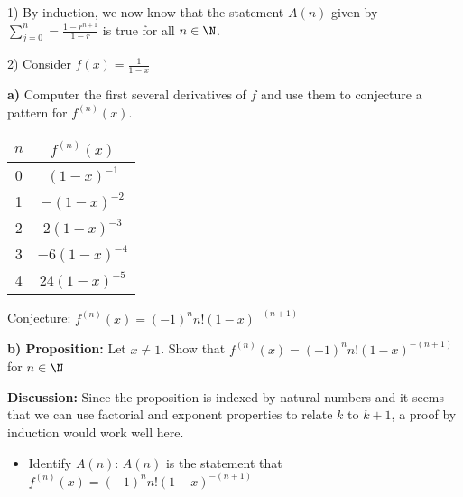 \begin{paragraph}{1)}
        By induction, we now know that the statement $A(n)$ given by $\sum_{j = 0}^{n} = \frac{1 - r^{n+1}}{1-r}$ is true for all $n \in \N$. \\
        \proofEnd
        
    \end{paragraph}

    \bigskip    

    \begin{paragraph}{2)}
        Consider $f(x) = \frac{1}{1-x}$
        \spacing

        \textbf{a)} Computer the first several derivatives of $f$ and use them to conjecture a pattern for $f^{(n)}(x)$.\\
        \separate
        \begin{center}
            \begin{tabular}{||c | c||}
                \hline
                $n$ & $f^{(n)}(x)$ \\ [0.5ex]
                \hline\hline
                0 & $(1 - x)^{-1}$ \\
                \hline
                1 & $-(1 - x)^{-2}$ \\
                \hline
                2 & $2(1 - x)^{-3}$ \\
                \hline
                3 & $-6(1 - x)^{-4}$ \\
                \hline
                4 & $24(1 - x)^{-5}$ \\
                \hline
            \end{tabular}
            \spacing

            Conjecture: $f^{(n)}(x) = (-1)^n n!(1-x)^{-(n + 1)}$
        \end{center}
        
        \bigskip
        
        \textbf{b) Proposition:} Let $x \neq 1$. Show that $f^{(n)}(x) = (-1)^n n!(1 - x)^{-(n + 1)}$ for $n \in \N$
        \spacing
        
        \textbf{Discussion:} Since the proposition is indexed by natural numbers and it seems that
        we can use factorial and exponent properties to relate $k$ to $k + 1$, a proof by induction would work well 
        here.
        \begin{itemize}
            \item{
                Identify $A(n)$: $A(n)$ is the statement that $f^{(n)}(x) = (-1)^n n!(1 - x)^{-(n + 1)}$
            }


\end{itemize}
\end{paragraph}
